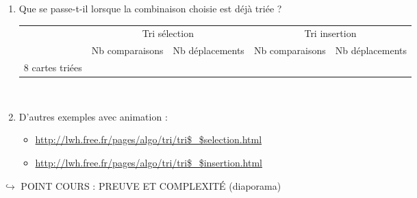 \documentclass[a4paper,french]{article}
\begin{document}
\begin{enumerate}
\item Que se passe-t-il lorsque la combinaison choisie est déjà triée ?

\setlength{\extrarowheight}{2mm}
\begin{tabular}{|c|c|c|c|c|}
\cline{2-5}
\multicolumn{1}{c|}{} &\multicolumn{2}{|c|}{Tri sélection} & \multicolumn{2}{|c|}{Tri insertion}
\\ \cline{2-5}
\multicolumn{1}{c|}{}  & Nb comparaisons & Nb déplacements & Nb comparaisons & Nb déplacements \\
\hline
8 cartes triées &   &   &   &   \\[2mm] \hline
\end{tabular}
\\[2mm]

\item D'autres exemples avec animation :
\begin{itemize}
\item \url{http://lwh.free.fr/pages/algo/tri/tri$\_$selection.html}
\item \url{http://lwh.free.fr/pages/algo/tri/tri$\_$insertion.html}
\end{itemize}
\end{enumerate}
\bigskip

$\hookrightarrow$ POINT COURS : PREUVE ET COMPLEXITÉ (diaporama)
\end{document}
